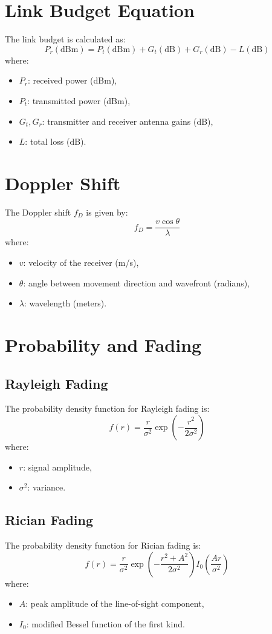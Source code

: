 \documentclass[a4paper,12pt]{book}
\begin{document}
	\section{Link Budget Equation}
	
	The link budget is calculated as:
	\[
	P_r (\text{dBm}) = P_t (\text{dBm}) + G_t (\text{dB}) + G_r (\text{dB}) - L (\text{dB})
	\]
	where:
	\begin{itemize}
		\item \( P_r \): received power (dBm),
		\item \( P_t \): transmitted power (dBm),
		\item \( G_t, G_r \): transmitter and receiver antenna gains (dB),
		\item \( L \): total loss (dB).
	\end{itemize}
	
	\section{Doppler Shift}
	
	The Doppler shift \( f_D \) is given by:
	\[
	f_D = \frac{v \cos \theta}{\lambda}
	\]
	where:
	\begin{itemize}
		\item \( v \): velocity of the receiver (m/s),
		\item \( \theta \): angle between movement direction and wavefront (radians),
		\item \( \lambda \): wavelength (meters).
	\end{itemize}
	
	\section{Probability and Fading}
	
	\subsection{Rayleigh Fading}
	
	The probability density function for Rayleigh fading is:
	\[
	f(r) = \frac{r}{\sigma^2} \exp \left( - \frac{r^2}{2\sigma^2} \right)
	\]
	where:
	\begin{itemize}
		\item \( r \): signal amplitude,
		\item \( \sigma^2 \): variance.
	\end{itemize}
	
	\subsection{Rician Fading}
	The probability density function for Rician fading is:
	\[
	f(r) = \frac{r}{\sigma^2} \exp \left( -\frac{r^2 + A^2}{2\sigma^2} \right) I_0 \left( \frac{Ar}{\sigma^2} \right)
	\]
	where:
	\begin{itemize}
		\item \( A \): peak amplitude of the line-of-sight component,
		\item \( I_0 \): modified Bessel function of the first kind.
	\end{itemize}
	
\end{document}
